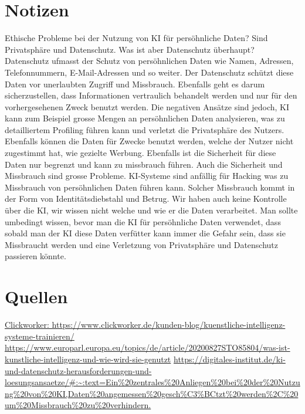 \documentclass{article}
\begin{document}
\section{Notizen}
Ethische Probleme bei der Nutzung von KI für persöhnliche Daten?
Sind Privatsphäre und Datenschutz. Was ist aber Datenschutz überhaupt? Datenschutz ufmasst der Schutz von persöhnlichen Daten wie Namen, Adressen, Telefonnummern, E-Mail-Adressen und so weiter. Der Datenschutz schützt diese Daten vor unerlaubten Zugriff und Missbrauch. Ebenfalls geht es darum sicherzustellen, dass Informationen vertraulich behandelt werden und nur für den vorhergesehenen Zweck benutzt werden. Die negativen Ansätze sind jedoch, KI kann zum Beispiel grosse Mengen an persöhnlichen Daten analysieren, was zu detailliertem Profiling führen kann und verletzt die Privatsphäre des Nutzers. Ebenfalls können die Daten für Zwecke benutzt werden, welche der Nutzer nicht zugestimmt hat, wie gezielte Werbung. Ebenfalls ist die Sicherheit für diese Daten nur begrenzt und kann zu missbrauch führen.
Auch die Sicherheit und Missbrauch sind grosse Probleme. KI-Systeme sind anfällig für Hacking was zu Missbrauch von persöhnlichen Daten führen kann. Solcher Missbrauch kommt in der Form von Identitätsdiebstahl und Betrug.
Wir haben auch keine Kontrolle über die KI, wir wissen nicht welche und wie er die Daten verarbeitet.
Man sollte umbedingt wissen, bevor man die KI für persöhnliche Daten verwendet, dass sobald man der KI diese Daten verfütter kann immer die Gefahr sein, dass sie Missbraucht werden und eine Verletzung von Privatsphäre und Datenschutz passieren könnte. 


\section{Quellen}
\url {Clickworker: https://www.clickworker.de/kunden-blog/kuenstliche-intelligenz-systeme-trainieren/}
\url {https://www.europarl.europa.eu/topics/de/article/20200827STO85804/was-ist-kunstliche-intelligenz-und-wie-wird-sie-genutzt}
\url{https://digitales-institut.de/ki-und-datenschutz-herausforderungen-und-loesungsansaetze/#:~:text=Ein%20zentrales%20Anliegen%20bei%20der%20Nutzung%20von%20KI,Daten%20angemessen%20gesch%C3%BCtzt%20werden%2C%20um%20Missbrauch%20zu%20verhindern.}
\end{document}
